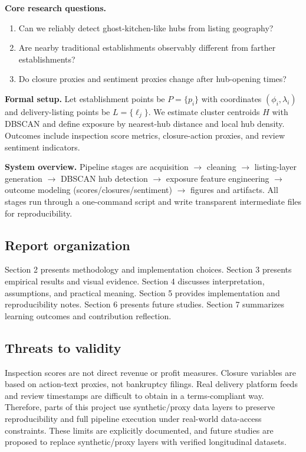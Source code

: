 \documentclass[10pt,twocolumn]{article}
\begin{document}
\textbf{Core research questions.}
\begin{enumerate}
\item Can we reliably detect ghost-kitchen-like hubs from listing geography?
\item Are nearby traditional establishments observably different from farther establishments?
\item Do closure proxies and sentiment proxies change after hub-opening times?
\end{enumerate}

\textbf{Formal setup.} Let establishment points be $P=\{p_i\}$ with coordinates $(\phi_i,\lambda_i)$ and delivery-listing points be $L=\{\ell_j\}$. We estimate cluster centroids $H$ with DBSCAN and define exposure by nearest-hub distance and local hub density. Outcomes include inspection score metrics, closure-action proxies, and review sentiment indicators.

\textbf{System overview.} Pipeline stages are acquisition $\rightarrow$ cleaning $\rightarrow$ listing-layer generation $\rightarrow$ DBSCAN hub detection $\rightarrow$ exposure feature engineering $\rightarrow$ outcome modeling (scores/closures/sentiment) $\rightarrow$ figures and artifacts. All stages run through a one-command script and write transparent intermediate files for reproducibility.

\subsection{Report organization}
Section 2 presents methodology and implementation choices. Section 3 presents empirical results and visual evidence. Section 4 discusses interpretation, assumptions, and practical meaning. Section 5 provides implementation and reproducibility notes. Section 6 presents future studies. Section 7 summarizes learning outcomes and contribution reflection.

\subsection{Threats to validity}
Inspection scores are not direct revenue or profit measures. Closure variables are based on action-text proxies, not bankruptcy filings. Real delivery platform feeds and review timestamps are difficult to obtain in a terms-compliant way. Therefore, parts of this project use synthetic/proxy data layers to preserve reproducibility and full pipeline execution under real-world data-access constraints. These limits are explicitly documented, and future studies are proposed to replace synthetic/proxy layers with verified longitudinal datasets.
\end{document}
